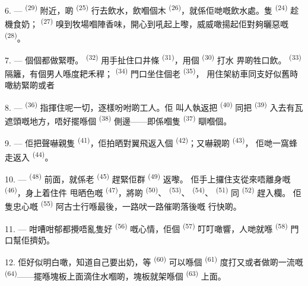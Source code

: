6. ---  \textsuperscript{(29)} 附近，啲 \textsuperscript{(25)}
行去飲水，飲嗰個木 \textsuperscript{(26)}，就係佢哋嘅飲水處。隻
 \textsuperscript{(24)} 趁機食奶； \textsuperscript{(27)}
嗅到牧場嗰陣香味，開心到吼起上嚟，威威噉揚起佢對夠曬惡嘅
\textsuperscript{(28)}。

7. --- 個個都做緊嘢。 \textsuperscript{(32)} 用手扯住口井條
 \textsuperscript{(31)}，用個 \textsuperscript{(30)} 打水
畀啲牲口飲。 \textsuperscript{(33)} 隔籬，有個男人喺度耙禾稈；
 \textsuperscript{(34)} 門口坐住個老 \textsuperscript{(35)}，
用住架紡車同支好似舊時噉紡緊啲或者

\VUsaut{3.0mm}
\VUsaut{3.0mm}

8. ---  \textsuperscript{(36)} 指揮住呢一切，逐樣吩咐啲工人。佢
叫人執返把 \textsuperscript{(40)} 同把 \textsuperscript{(39)}
入去有瓦遮頭嘅地方，唔好擺喺個 \textsuperscript{(38)} 側邊——即係嗰隻
 \textsuperscript{(37)} 瞓嗰個。

9. --- 佢把聲嚇親隻 \textsuperscript{(41)}，佢拍晒對翼飛返入個
 \textsuperscript{(42)}；又嚇親啲 \textsuperscript{(43)}，
佢哋一窩蜂走返入 \textsuperscript{(44)}。

10. ---  \textsuperscript{(48)} 前面，就係老
\textsuperscript{(45)} 趕緊佢群 \textsuperscript{(49)} 返嚟。
佢手上攞住支從來唔離身嘅 \textsuperscript{(46)}，身上着住件
甩晒色嘅 \textsuperscript{(47)}，將啲 \textsuperscript{(50)}、
 \textsuperscript{(53)}、 \textsuperscript{(54)}、
 \textsuperscript{(51)} 同 \textsuperscript{(52)} 趕入欄。
佢隻忠心嘅 \textsuperscript{(55)} 阿古士行喺最後，一路吠一路催啲落後嘅
行快啲。

11. --- 咁嘈咁郁都攪唔亂隻好 \textsuperscript{(56)} 嘅心情，佢個
 \textsuperscript{(57)} 叮叮噉響，人哋就喺 \textsuperscript{(58)}
門口幫佢擠奶。

12. 佢好似明白噉，知道自己要出奶，等 \textsuperscript{(60)} 可以喺個
 \textsuperscript{(61)} 度打又或者做啲一流嘅
 \textsuperscript{(64)}——擺喺塊板上面滴住水嗰啲，塊板就架喺個
 \textsuperscript{(63)} 上面。

